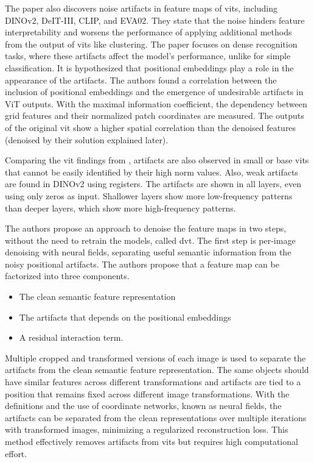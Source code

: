 \documentclass[conference]{IEEEtran}
\begin{document}
  The paper also discovers noise artifacts in feature maps of \acp{vit}, including \mbox{DINOv2}, DeIT-III, CLIP, and EVA02. They state that the noise hinders feature interpretability and worsens the performance of applying additional methods from the output of \acp{vit} like clustering. The paper focuses on dense recognition tasks, where these artifacts affect the model's performance, unlike for simple classification. It is hypothesized that positional embeddings play a role in the appearance of the artifacts. The authors found a correlation between the inclusion of positional embeddings and the emergence of undesirable artifacts in ViT outputs. With the maximal information coefficient, the dependency between grid features and their normalized patch coordinates are measured. The outputs of the original \ac{vit} show a higher spatial correlation than the denoised features (denoised by their solution explained later).

  Comparing the \ac{vit} findings from \citeauthor{registers} \cite{registers}, artifacts are also observed in small or base \acp{vit} that cannot be easily identified by their high norm values. Also, weak artifacts are found in \mbox{DINOv2} using registers. The artifacts are shown in all layers, even using only zeros as input. Shallower layers show more low-frequency patterns than deeper layers, which show more high-frequency patterns.
 
  The authors propose an approach to denoise the feature maps in two steps, without the need to retrain the models, called \acf{dvt}. The first step is per-image denoising with neural fields, separating useful semantic information from the noisy positional artifacts. The authors propose that a feature map can be factorized into three components.
  \begin{itemize}
    \item The clean semantic feature representation
    \item The artifacts that depends on the positional embeddings
    \item A residual interaction term.
  \end{itemize}

  Multiple cropped and transformed versions of each image is used to separate the artifacts from the clean semantic feature representation. The same objects should have similar features across different transformations and artifacts are tied to a position that remains fixed across different image transformations. With the definitions and the use of coordinate networks, known as neural fields, the artifacts can be separated from the clean representations over multiple iterations with transformed images, minimizing a regularized reconstruction loss. This method effectively removes artifacts from \acp{vit} but requires high computational effort.
\end{document}
